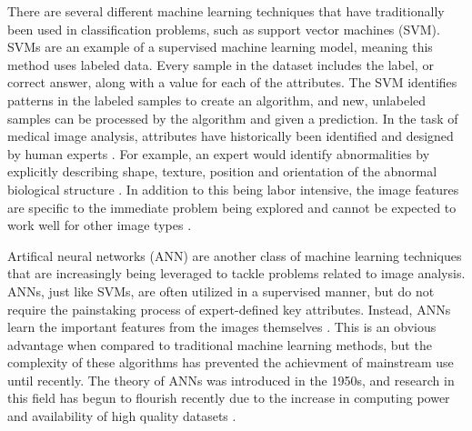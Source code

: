 \documentclass[sigconf]{acmart}
\begin{document}
There are several different machine learning techniques that have traditionally been used in classification problems, such as support vector machines (SVM). SVMs are an example of a supervised machine learning model, meaning this method uses labeled data. Every sample in the dataset includes the label, or correct answer, along with a value for each of the attributes. The SVM identifies patterns in the labeled samples to create an algorithm, and new, unlabeled samples can be processed by the algorithm and given a prediction. In the task of medical image analysis, attributes have historically been identified and designed by human experts \cite{cite06}. For example, an expert would identify abnormalities by explicitly describing shape, texture, position and orientation of the abnormal biological structure \cite{cite07}.  In addition to this being labor intensive, the image features are specific to the immediate problem being explored and cannot be expected to work well for other image types \cite{cite06}.

Artifical neural networks (ANN) are another class of machine learning techniques that are increasingly being leveraged to tackle problems related to image analysis. ANNs, just like SVMs, are often utilized in a supervised manner, but do not require the painstaking process of expert-defined key attributes. Instead, ANNs learn the important features from the images themselves \cite{cite07}. This is an obvious advantage when compared to traditional machine learning methods, but the complexity of these algorithms has prevented the achievment of mainstream use until recently. The theory of ANNs was introduced in the 1950s, and research in this field has begun to flourish recently due to the increase in computing power and availability of high quality datasets \cite{cite05}.
\end{document}
